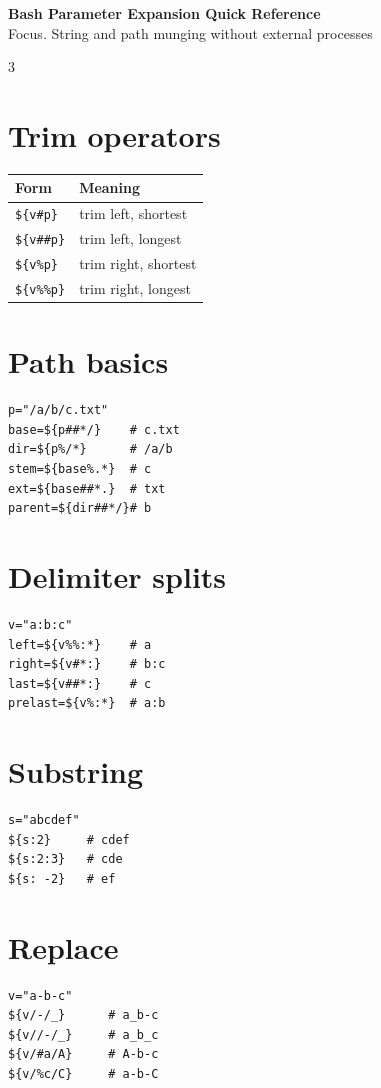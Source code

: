 \documentclass[10pt]{article}
\begin{document}
\begin{center}
{\Large\bfseries Bash Parameter Expansion Quick Reference}\\
{\small Focus. String and path munging without external processes}
\end{center}

\begin{multicols}{3}

\section*{Trim operators}
\begin{tabular}{@{}ll@{}}
\toprule
Form & Meaning \\
\midrule
\texttt{\$\{v\#p\}} & trim left, shortest \\
\texttt{\$\{v\#\#p\}} & trim left, longest \\
\texttt{\$\{v\%p\}} & trim right, shortest \\
\texttt{\$\{v\%\%p\}} & trim right, longest \\
\bottomrule
\end{tabular}

\section*{Path basics}
\begin{lstlisting}
p="/a/b/c.txt"
base=${p##*/}    # c.txt
dir=${p%/*}      # /a/b
stem=${base%.*}  # c
ext=${base##*.}  # txt
parent=${dir##*/}# b
\end{lstlisting}

\section*{Delimiter splits}
\begin{lstlisting}
v="a:b:c"
left=${v%%:*}    # a
right=${v#*:}    # b:c
last=${v##*:}    # c
prelast=${v%:*}  # a:b
\end{lstlisting}

\section*{Substring}
\begin{lstlisting}
s="abcdef"
${s:2}     # cdef
${s:2:3}   # cde
${s: -2}   # ef
\end{lstlisting}

\section*{Replace}
\begin{lstlisting}
v="a-b-c"
${v/-/_}      # a_b-c
${v//-/_}     # a_b_c
${v/#a/A}     # A-b-c
${v/%c/C}     # a-b-C
\end{lstlisting}


\end{multicols}
\end{document}
